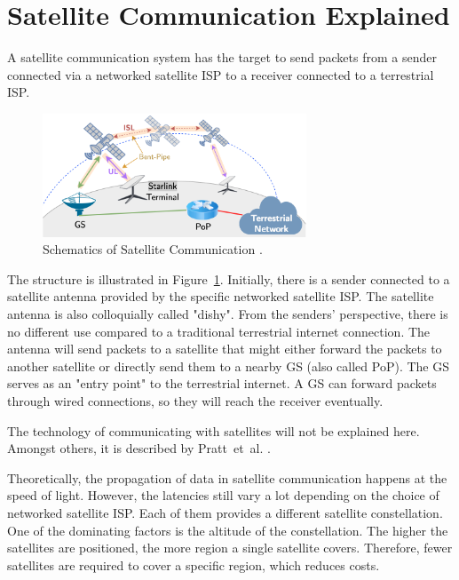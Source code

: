 \section{Satellite Communication Explained} \label{sec:satellite-communication-explained}

A satellite communication system has the target to send packets from a sender
connected via a networked satellite ISP to a receiver connected to a terrestrial
ISP.

\begin{figure}[!ht]
	\centering
	\includegraphics[width=0.7\textwidth]{./chapters/2-background/img/satcom-structure-mohan.png}
	\caption{Schematics of Satellite Communication \cite{DBLP:conf/www/MohanFCBRMO24}.}
	\label{fig:sat-com-explained}
\end{figure}

The structure is illustrated in Figure~\ref{fig:sat-com-explained}.
Initially, there is a sender connected to a satellite antenna provided by the
specific networked satellite ISP. The satellite antenna is also colloquially
called "dishy". From the senders' perspective, there is no different use
compared to a traditional terrestrial internet connection. The antenna will
send packets to a satellite that might either forward the packets to another
satellite or directly send them to a nearby \ac{GS} (also called \ac{PoP}). The
\ac{GS} serves as an "entry point" to the terrestrial internet. A \ac{GS} can
forward packets through wired connections, so they will reach the receiver
eventually.

The technology of communicating with satellites will not be explained here.
Amongst others, it is described by Pratt~et~al. \cite{pratt2019satellite}.

Theoretically, the propagation of data in satellite communication happens at
the speed of light. However, the latencies still vary a lot depending on the
choice of networked satellite ISP. Each of them provides a different satellite
constellation. One of the dominating factors is the altitude of the
constellation. The higher the satellites are positioned, the more region a
single satellite covers. Therefore, fewer satellites are required to cover a
specific region, which reduces costs.

